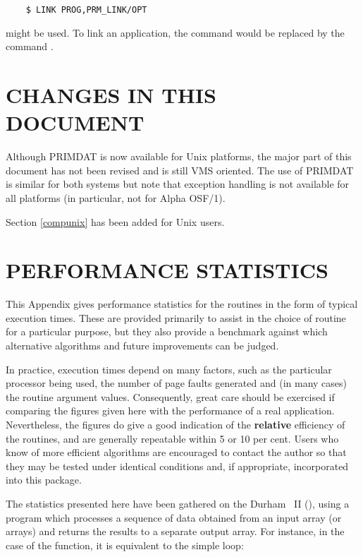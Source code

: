 \begin{verbatim}
    $ LINK PROG,PRM_LINK/OPT
\end{verbatim}

might be used.
To link an  application, the  command would be
replaced by the  command .

\section{CHANGES IN THIS DOCUMENT}
Although PRIMDAT is now available for Unix platforms, the major part of this
document has not been revised and is still VMS oriented.
The use of PRIMDAT is similar for both systems but note that exception
handling is not available for all platforms (in particular, not for
Alpha OSF/1).

Section \ref{compunix} has been added for Unix users.

\appendix

\newpage

\section{PERFORMANCE STATISTICS}

\label{appendix:statistics}

This Appendix gives performance statistics for the  routines
in the form of typical execution times.
These are provided primarily to assist in the choice of routine for a
particular purpose, but they also provide a benchmark against which
alternative algorithms and future improvements can be judged.

In practice, execution times depend on many factors, such as the
particular processor being used, the number of page faults generated
and (in many cases) the routine argument values.
Consequently, great care should be exercised if comparing the figures given
here with the performance of a real application.
Nevertheless, the figures do give a good indication of the {\bf relative}
efficiency of the routines, and are generally repeatable within 5 or 10 per
cent.
Users who know of more efficient algorithms are encouraged to contact the
author so that they may be tested under identical conditions and, if
appropriate, incorporated into this package.

The statistics presented here have been gathered on the Durham
~II (), using a program which processes a
sequence of data obtained from an input array (or arrays) and returns the
results to a separate output array.
For instance, in the case of the  function, it is equivalent
to the simple loop:

